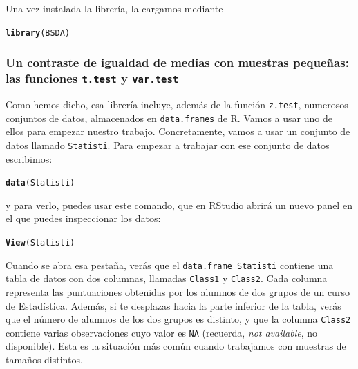 \documentclass[10pt,a4paper]{article}\usepackage[]{graphicx}\usepackage[]{color}
\makeatletter
\newcommand{\hlstd}[1]{\textcolor[rgb]{0.345,0.345,0.345}{#1}}%
\newcommand{\hlkwd}[1]{\textcolor[rgb]{0.737,0.353,0.396}{\textbf{#1}}}%
\newenvironment{kframe}{%
 \def\at@end@of@kframe{}%
 \ifinner\ifhmode%
  \def\at@end@of@kframe{\end{minipage}}%
  \begin{minipage}{\columnwidth}%
 \fi\fi%
 \def\FrameCommand##1{\hskip\@totalleftmargin \hskip-\fboxsep
 \colorbox{shadecolor}{##1}\hskip-\fboxsep
     \hskip-\linewidth \hskip-\@totalleftmargin \hskip\columnwidth}%
 \MakeFramed {\advance\hsize-\width
   \@totalleftmargin\z@ \linewidth\hsize
   \@setminipage}}%
 {\par\unskip\endMakeFramed%
 \at@end@of@kframe}
\newenvironment{knitrout}{}{} %
\newcounter {cont01}
\makeatother
\begin{document}
Una vez instalada la librería, la cargamos mediante
\begin{knitrout}
\color{fgcolor}\begin{kframe}
\begin{alltt}
\hlkwd{library}\hlstd{(BSDA)}
\end{alltt}


{\ttfamily\noindent\bfseries\color{errorcolor}{\#\# Error in library(BSDA): there is no package called 'BSDA'}}\end{kframe}
\end{knitrout}

\subsubsection*{Un contraste de igualdad de medias con muestras pequeñas: las funciones {\tt t.test} y {\tt var.test}}

Como hemos dicho, esa librería incluye, además de la función {\tt z.test}, numerosos conjuntos de datos, almacenados en {\tt data.frames} de R. Vamos a usar uno de ellos para empezar nuestro trabajo. Concretamente, vamos a usar un conjunto de datos llamado {\tt Statisti}. Para empezar a trabajar con ese conjunto de datos escribimos:
\begin{knitrout}
\color{fgcolor}\begin{kframe}
\begin{alltt}
\hlkwd{data}\hlstd{(Statisti)}
\end{alltt}


{\ttfamily\noindent\color{warningcolor}{\#\# Warning in data(Statisti): data set 'Statisti' not found}}\end{kframe}
\end{knitrout}
y para verlo, puedes usar este comando, que en RStudio abrirá un nuevo panel en el que puedes inspeccionar los datos:
\begin{knitrout}
\color{fgcolor}\begin{kframe}
\begin{alltt}
\hlkwd{View}\hlstd{(Statisti)}
\end{alltt}
\end{kframe}
\end{knitrout}
Cuando se abra esa pestaña, verás que el {\tt data.frame Statisti} contiene una tabla de datos con dos columnas, llamadas  {\tt Class1} y {\tt Class2}. Cada columna representa las puntuaciones obtenidas por los alumnos de dos grupos de un curso de Estadística.  Además, si te desplazas hacia la parte inferior de la tabla, verás que el número de alumnos de los dos grupos es distinto, y que la columna {\tt Class2} contiene varias observaciones cuyo valor es {\tt NA} (recuerda, {\em not available}, no disponible). Esta es la situación más común cuando trabajamos con muestras de tamaños distintos.
\end{document}
